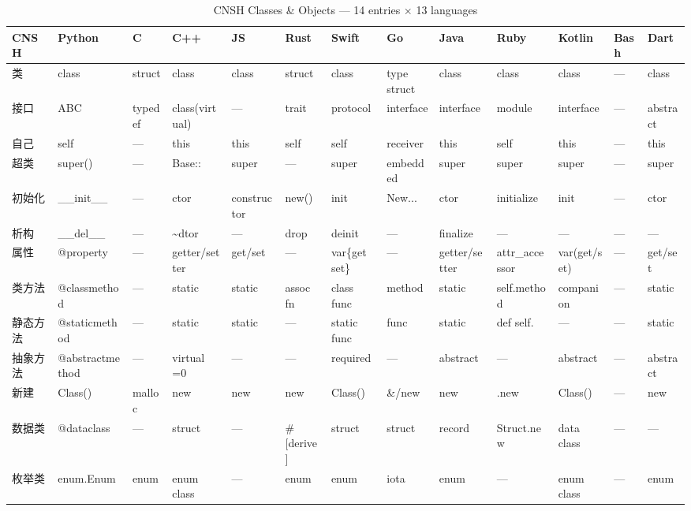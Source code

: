 \begin{table}[h]
\centering
\caption{CNSH Classes \& Objects — 14 entries × 13 languages}
\renewcommand{\arraystretch}{1.2}
\fontsize{8}{10}\selectfont
\begin{tabular}{lllllllllllll}
\toprule
\textbf{CNSH} & \textbf{Python} & \textbf{C} & \textbf{C++} & \textbf{JS} & \textbf{Rust} & \textbf{Swift} & \textbf{Go} & \textbf{Java} & \textbf{Ruby} & \textbf{Kotlin} & \textbf{Bash} & \textbf{Dart} \\
\midrule
类 & class & struct & class & class & struct & class & type struct & class & class & class & — & class \\
接口 & ABC & typedef & class(virtual) & — & trait & protocol & interface & interface & module & interface & — & abstract \\
自己 & self & — & this & this & self & self & receiver & this & self & this & — & this \\
超类 & super() & — & Base:: & super & — & super & embedded & super & super & super & — & super \\
初始化 & \_\_init\_\_ & — & ctor & constructor & new() & init & New... & ctor & initialize & init & — & ctor \\
析构 & \_\_del\_\_ & — & \textasciitilde dtor & — & drop & deinit & — & finalize & — & — & — & — \\
属性 & @property & — & getter/setter & get/set & — & var\{get set\} & — & getter/setter & attr\_accessor & var(get/set) & — & get/set \\
类方法 & @classmethod & — & static & static & assoc fn & class func & method & static & self.method & companion & — & static \\
静态方法 & @staticmethod & — & static & static & — & static func & func & static & def self. & — & — & static \\
抽象方法 & @abstractmethod & — & virtual =0 & — & — & required & — & abstract & — & abstract & — & abstract \\
新建 & Class() & malloc & new & new & new & Class() & \&/new & new & .new & Class() & — & new \\
数据类 & @dataclass & — & struct & — & \#[derive] & struct & struct & record & Struct.new & data class & — & — \\
枚举类 & enum.Enum & enum & enum class & — & enum & enum & iota & enum & — & enum class & — & enum \\
\bottomrule
\end{tabular}
\end{table}

